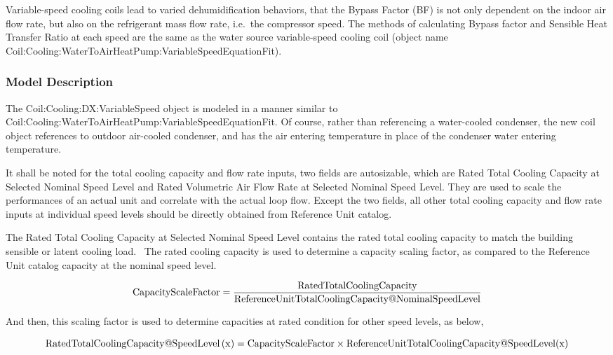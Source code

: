 Variable-speed cooling coils lead to varied dehumidification behaviors, that the Bypass Factor (BF) is not only dependent on the indoor air flow rate, but also on the refrigerant mass flow rate, i.e.~the compressor speed. The methods of calculating Bypass factor and Sensible Heat Transfer Ratio at each speed are the same as the water source variable-speed cooling coil (object name Coil:Cooling:WaterToAirHeatPump:VariableSpeedEquationFit).

\subsubsection{Model Description}\label{model-description-3-003}

The Coil:Cooling:DX:VariableSpeed object is modeled in a manner similar to Coil:Cooling:WaterToAirHeatPump:VariableSpeedEquationFit. Of course, rather than referencing a water-cooled condenser, the new coil object references to outdoor air-cooled condenser, and has the air entering temperature in place of the condenser water entering temperature.

It shall be noted for the total cooling capacity and flow rate inputs, two fields are autosizable, which are Rated Total Cooling Capacity at Selected Nominal Speed Level and Rated Volumetric Air Flow Rate at Selected Nominal Speed Level. They are used to scale the performances of an actual unit and correlate with the actual loop flow. Except the two fields, all other total cooling capacity and flow rate inputs at individual speed levels should be directly obtained from Reference Unit catalog.

The Rated Total Cooling Capacity at Selected Nominal Speed Level contains the rated total cooling capacity to match the building sensible or latent cooling load.~ The rated cooling capacity is used to determine a capacity scaling factor, as compared to the Reference Unit catalog capacity at the nominal speed level.

\begin{equation}
{\rm{CapacityScaleFactor}} = \frac{{{\rm{RatedTotalCoolingCapacity}}}}{{{\rm{ReferenceUnitTotalCoolingCapacity}}@{\rm{NominalSpeedLevel}}}}
\end{equation}

And then, this scaling factor is used to determine capacities at rated condition for other speed levels, as below,

\begin{equation}
{\rm{RatedTotalCoolingCapacity}}@{\rm{SpeedLevel}}\left( {\rm{x}} \right) = {\rm{CapacityScaleFactor}} \times {\rm{ReferenceUnitTotalCoolingCapacity}}@{\rm{SpeedLevel}}({\rm{x}})
\end{equation}

